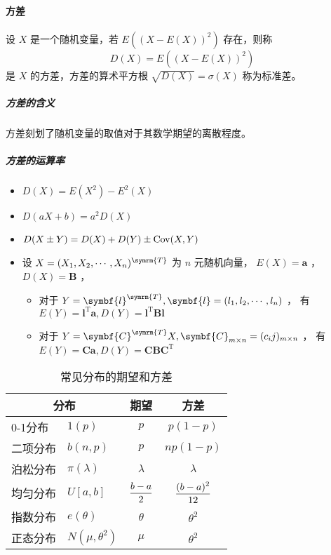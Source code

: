 \paragraph{方差} 设 $ X $ 是一个随机变量，若 $ E((X - E(X))^2) $ 存在，则称
$$ D(X) = E((X - E(X))^2) $$
是 $ X $ 的方差，方差的算术平方根 $ \sqrt{D(X)} = \sigma(X) $ 称为标准差。

\subparagraph{方差的含义} 方差刻划了随机变量的取值对于其数学期望的离散程度。

\subparagraph{方差的运算率}
\begin{itemize}[leftmargin=\subparitemindent]
    \item $ D(X) = E(X^2) - E^2(X) $
    \item $ D(aX + b) = a^2 D(X) $
    \item $ D(X \pm Y) = D(X) + D(Y) \pm \mathrm{Cov}(X,Y) $
    \item 设 $ X = (X_1, X_2, \cdots, X_n)^{\symrm{T}} $ 为 $ n $ 元随机向量， $ E(X) = \symbf{a} $ ，$ D(X) = \symbf{B} $ ，
    \begin{itemize}
        \item 对于 $ Y = \symbf{l}^{\symrm{T}}, \symbf{l} = (l_1, l_2, \cdots, l_n) $ ，
        有 $ E(Y) = \symbf{l}^{\mathrm{T}} \symbf{a}, D(Y) = \symbf{l}^{\mathrm{T}}\symbf{B}\symbf{l} $
        \item 对于 $ Y = \symbf{C}^{\symrm{T}}X, \symbf{C}_{m\times n} = (c_ij)_{m\times n} $ ，
        有 $ E(Y) = \symbf{C} \symbf{a}, D(Y) = \symbf{C}\symbf{B}\symbf{C}^{\mathrm{T}} $
    \end{itemize}
\end{itemize}

\begin{table}[htbp]
    \centering
    \caption{常见分布的期望和方差}
    \begin{tabular}{llcc} \toprule
        \multicolumn{2}{c}{分布} & 期望 & 方差 \\\midrule
        0-1分布 & $ 1(p) $ & $ p $ & $ p(1-p) $ \\\midrule
        二项分布 & $ b(n,p) $ & $ p $ & $ np(1-p) $ \\\midrule
        泊松分布 & $ \pi(\lambda) $ & $ \lambda $ & $ \lambda $ \\\midrule
        均匀分布 & $ U[a,b] $ & $ \displaystyle{\frac{\displaystyle{b-a}}{\displaystyle{2}}} $ & $ \displaystyle{\frac{\displaystyle{(b-a)^2}}{\displaystyle{12}}} $ \\\midrule
        指数分布 & $ e(\theta) $ & $ \theta $ & $ \theta^2 $ \\\midrule
        正态分布 & $ N(\mu, \theta^2) $ & $ \mu $ & $ \theta^2 $ \\\bottomrule
        
    \end{tabular}
\end{table}

